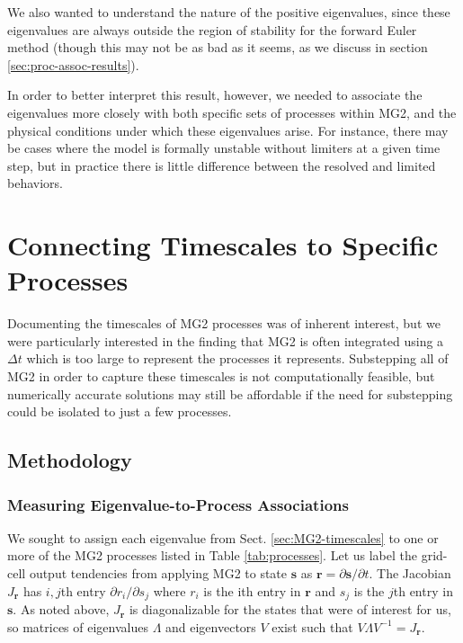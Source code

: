 \documentclass [11pt, proquest] {uwthesis}[2020/02/24]
\begin{document}
We also wanted to understand the nature of the positive eigenvalues, since these eigenvalues are always outside the region of stability for the forward Euler method (though this may not be as bad as it seems, as we discuss in section \ref{sec:proc-assoc-results}).

In order to better interpret this result, however, we needed to associate the eigenvalues more closely with both specific sets of processes within MG2, and the physical conditions under which these eigenvalues arise. For instance, there may be cases where the model is formally unstable without limiters at a given time step, but in practice there is little difference between the resolved and limited behaviors.

\section{Connecting Timescales to Specific Processes} \label{sec:MG2-proc-timescales}

Documenting the timescales of MG2 processes was of inherent interest, but we were particularly interested in the finding that MG2 is often integrated using a $\Delta t$ which is too large to represent the processes it represents. Substepping all of MG2 in order to capture these timescales is not computationally feasible, but numerically accurate solutions may still be affordable if the need for substepping could be isolated to just a few processes.

\subsection{Methodology}
\subsubsection{Measuring Eigenvalue-to-Process Associations}

We sought to assign each eigenvalue from Sect. \ref{sec:MG2-timescales} to one or more of the MG2 processes listed in Table \ref{tab:processes}. Let us label the grid-cell output tendencies from applying MG2 to state $\mathbf{s}$ as $\mathbf{r} = \partial \mathbf{s}/\partial t$. The Jacobian $J_{\mathbf{r}}$ has $i,j$th entry $\partial r_i/\partial s_j$ where $r_i$ is the ith entry in $\mathbf{r}$ and $s_j$ is the $j$th entry in $\mathbf{s}$. As noted above, $J_{\mathbf{r}}$ is diagonalizable for the states that were of interest for us, so matrices of eigenvalues $\Lambda$ and eigenvectors $V$ exist such that $V \Lambda V^{-1} = J_{\mathbf{r}}$.
\end{document}
